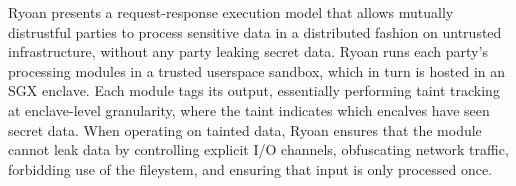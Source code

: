 %
Ryoan presents a request-response execution model that allows mutually
distrustful parties to process sensitive data in a distributed fashion on
untrusted infrastructure, without any party leaking secret data.
%
Ryoan runs each party's processing modules in a trusted userspace sandbox,
which in turn is hosted in an SGX enclave.
%
Each module tags its output, essentially performing taint tracking at
enclave-level granularity, where the taint indicates which encalves have seen
secret data.
%
When operating on tainted data, Ryoan ensures that the module cannot leak data
by controlling explicit I/O channels, obfuscating network traffic, forbidding
use of the fileystem, and ensuring that input is only processed once.


